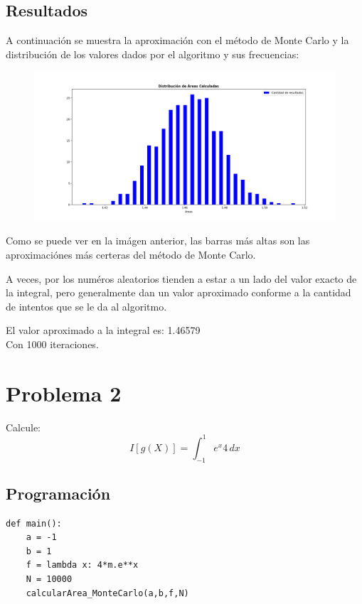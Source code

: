 \documentclass[a4paper,12pt]{article}
\begin{document}
    \subsection{Resultados}
    A continuación se muestra la aproximación con el método de Monte Carlo y 
    la distribución de los valores dados por el algoritmo y sus frecuencias:
    \begin{figure}[h]
        \centering
        \includegraphics[width=\textwidth]{ejer1.png}
    \end{figure}

    Como se puede ver en la imágen anterior, las barras más altas son 
    las aproximaciónes más certeras del método de Monte Carlo.

    A veces, por los numéros aleatorios tienden a estar a un lado del valor exacto
    de la integral, pero generalmente dan un valor aproximado conforme a la cantidad de 
    intentos que se le da al algoritmo.

    El valor aproximado a la integral es: 1.46579\\
    Con 1000 iteraciones.
    
    \section{Problema 2}
    Calcule:
    \begin{equation}
        I[g(X)] = \int_{-1}^{1} e^{x}4 \,dx
    \end{equation}
    \subsection{Programación}
\begin{lstlisting}	
def main():
    a = -1
    b = 1
    f = lambda x: 4*m.e**x
    N = 10000
    calcularArea_MonteCarlo(a,b,f,N)
\end{lstlisting}
\end{document}
